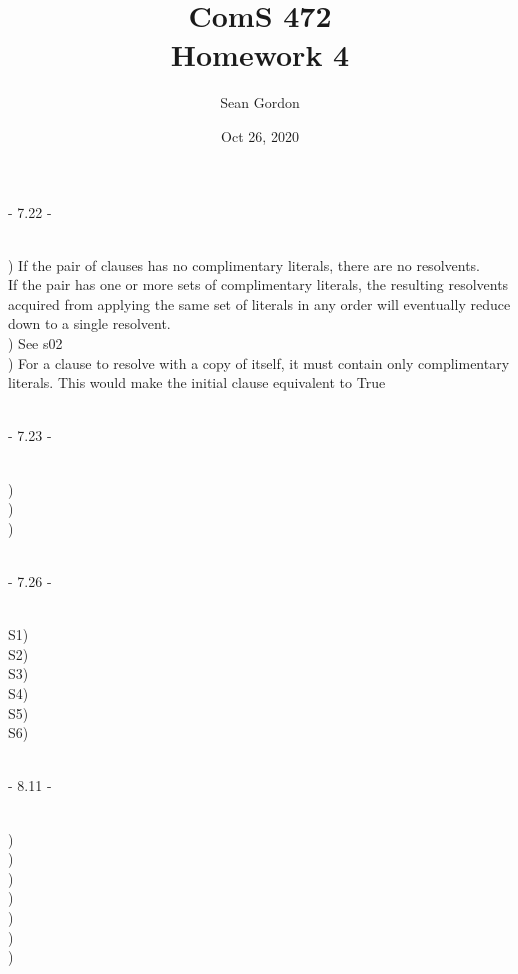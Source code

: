 \documentclass[12pt]{article}
\title{ComS 472\\Homework 4}
\author{Sean Gordon}
\date{Oct 26, 2020}
\begin{document}
\maketitle


\centerline{- 7.22 - }
\ \\
) If the pair of clauses has no complimentary literals, there are no resolvents. \checkmark\\[.4em]
\indent If the pair has one or more sets of complimentary literals, the resulting resolvents \\
\indent acquired from applying the same set of literals in any order will eventually reduce\\
\indent down to a single resolvent. \checkmark\\

) See s02\\[.4em]

) For a clause to resolve with a copy of itself, it must contain only complimentary \\[.4em]
\indent literals. This would make the initial clause equivalent to True\\[.4em]



\noindent \hrulefill \\



\centerline{- 7.23 - }
\ \\
) \\[.4em]
) \\[.4em]
) \\[.4em]



\noindent \hrulefill \\



\centerline{- 7.26 - }
\ \\
\noindent S1) \\[.4em]
\noindent S2) \\[.4em]
\noindent S3) \\[.4em]
\noindent S4) \\[.4em]
\noindent S5) \\[.4em]
\noindent S6) \\[.4em]



\noindent \hrulefill \\



\centerline{- 8.11 - }
\ \\
) \\[.4em]
) \\[.4em]
) \\[.4em]
) \\[.4em]
) \\[.4em]
) \\[.4em]
) \\[.4em]
\end{document}
